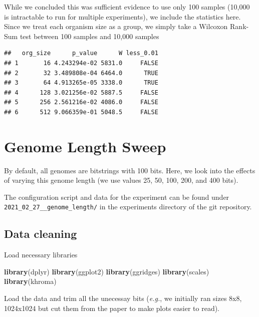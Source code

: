 \documentclass[]{book}
\newenvironment{Shaded}{\begin{snugshade}}{\end{snugshade}}
\newcommand{\KeywordTok}[1]{\textcolor[rgb]{0.13,0.29,0.53}{\textbf{#1}}}
\newcommand{\NormalTok}[1]{#1}
\begin{document}
While we concluded this was sufficient evidence to use only 100 samples (10,000 is intractable to run for multiple experiments), we include the statistics here.
Since we treat each organism size as a group, we simply take a Wilcoxon Rank-Sum test between 100 samples and 10,000 samples

\begin{verbatim}
##   org_size      p_value      W less_0.01
## 1       16 4.243294e-02 5831.0     FALSE
## 2       32 3.489808e-04 6464.0      TRUE
## 3       64 4.913265e-05 3338.0      TRUE
## 4      128 3.021256e-02 5887.5     FALSE
## 5      256 2.561216e-02 4086.0     FALSE
## 6      512 9.066359e-01 5048.5     FALSE
\end{verbatim}

\hypertarget{genome-length-sweep}{%
\chapter{Genome Length Sweep}\label{genome-length-sweep}}

By default, all genomes are bitstrings with 100 bits.
Here, we look into the effects of varying this genome length (we use values 25, 50, 100, 200, and 400 bits).

The configuration script and data for the experiment can be found under \texttt{2021\_02\_27\_\_genome\_length/} in the experiments directory of the git repository.

\hypertarget{data-cleaning-3}{%
\section{Data cleaning}\label{data-cleaning-3}}

Load necessary libraries

\begin{Shaded}
\begin{Highlighting}[]
\KeywordTok{library}\NormalTok{(dplyr)}
\KeywordTok{library}\NormalTok{(ggplot2)}
\KeywordTok{library}\NormalTok{(ggridges)}
\KeywordTok{library}\NormalTok{(scales)}
\KeywordTok{library}\NormalTok{(khroma)}
\end{Highlighting}
\end{Shaded}

Load the data and trim all the unecessay bits (\emph{e.g.}, we initially ran sizes 8x8, 1024x1024 but cut them from the paper to make plots easier to read).
\end{document}
